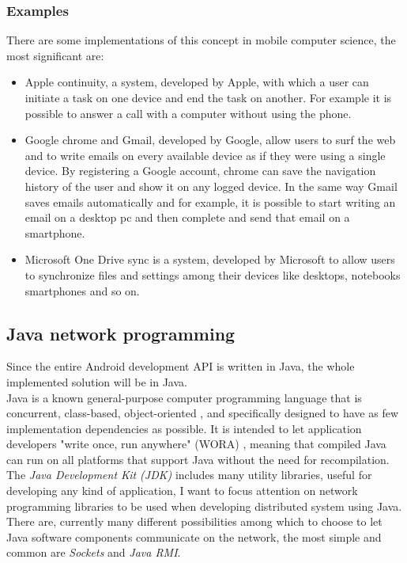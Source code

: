 \subsubsection{Examples}
There are some implementations of this concept in mobile computer science, the most significant are:
\begin{itemize}
	\item Apple continuity, a system, developed by Apple, with which a user can initiate a task on one device and end the task on another. For example it is possible to answer a call with a computer without using the phone.
	\item Google chrome and Gmail, developed by Google, allow users to surf the web and to write emails on every available device as if they were using a single device. By registering a Google account, chrome can save the navigation history of the user and show it on any logged device. In the same way Gmail saves emails automatically and for example, it is possible to start writing an email on a desktop pc and then complete and send that email on a smartphone.
	\item Microsoft One Drive sync is a system, developed by Microsoft to allow users to synchronize files and settings among their devices like desktops, notebooks smartphones and so on.
\end{itemize}

\subsection{Java network programming}
Since the entire Android development API is written in Java, the whole implemented solution will be in Java.\\ Java is a known general-purpose computer programming language that is concurrent, class-based, object-oriented \cite{gosling2005the}, and specifically designed to have as few implementation dependencies as possible. It is intended to let application developers "write once, run anywhere" (WORA) \cite{computer2002write}, meaning that compiled Java can run on all platforms that support Java without the need for recompilation.\\
The \textit{Java Development Kit (JDK)} includes many utility libraries, useful for developing any kind of application, I want to focus attention on network programming libraries to be used when developing distributed system using Java.
There are, currently many different possibilities among which to choose to let Java software components communicate on the network, the most simple and common are \textit{Sockets} and \textit{Java RMI}.
